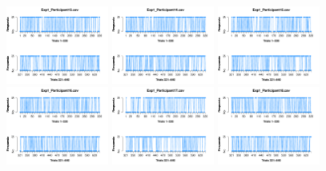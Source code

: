 \begin{itemize}
\begin{figure}[th]
\includegraphics[width=0.30\textwidth]{Figures/Response_Exp1_P13} \includegraphics[width=0.30\textwidth]{Figures/Response_Exp1_P14} \includegraphics[width=0.30\textwidth]{Figures/Response_Exp1_P15}
\includegraphics[width=0.30\textwidth]{Figures/Response_Exp1_P16} \includegraphics[width=0.30\textwidth]{Figures/Response_Exp1_P17} \includegraphics[width=0.30\textwidth]{Figures/Response_Exp1_P18}

\end{figure}
\end{itemize}
